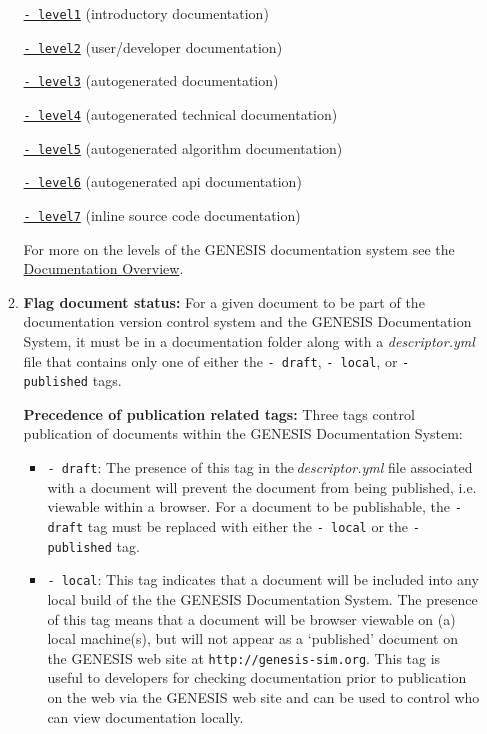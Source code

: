 \documentclass[12pt]{article}
\begin{document}
\begin{enumerate}
\begin{enumerate}
\href{../contents-level1/contents-level1.tex}{{\tt - level1}} (introductory documentation)

\href{../contents-level2/contents-level2.tex}{{\tt - level2}} (user/developer documentation)

\href{../contents-level3/contents-level3.tex}{{\tt - level3}} (autogenerated documentation)

\href{../contents-level4/contents-level4.tex}{{\tt - level4}} (autogenerated technical documentation)

\href{../contents-level5/contents-level5.tex}{{\tt - level5}} (autogenerated algorithm documentation)

\href{../contents-level6/contents-level6.tex}{{\tt - level6}} (autogenerated api documentation)

\href{../contents-level7/contents-level7.tex}{{\tt - level7}} (inline source code documentation)

For more on the levels of the GENESIS documentation system see the \href{../documentation-overview/documentation-overview.tex}{Documentation Overview}.

\item {\bf Flag document status:} For a given document to be part of the documentation version control system and the GENESIS Documentation System, it must be in a documentation folder along with a {\it descriptor.yml} file that contains only one of either the {\tt -\,draft}, {\tt -\,local}, or {\tt -\,published} tags.

{\bf Precedence of publication related tags:} Three tags control publication of documents within the GENESIS Documentation System:
\begin{itemize}
	\item[]{\tt -\,draft}: The presence of this tag in the\,{\it descriptor.yml} file associated with a document will prevent the document 
	from being published,  i.e. viewable within a browser. For a document to be publishable, the {\tt -\,draft} tag must be replaced 
	with either the {\tt -\,local} or the {\tt -\,published} tag.
	
	\item[]{\tt -\,local}: This tag indicates that a document will be included into any local build of the the GENESIS Documentation 
	System. The presence of this tag means that a document will be browser viewable on (a) local machine(s), but will not appear as a `published' 
	document on the GENESIS web site at {\tt http://genesis-sim.org}. This tag is useful to developers for checking documentation prior to publication on the web via the GENESIS web site and can be used to control who can view documentation locally.
	

\end{itemize}
\end{enumerate}
\end{enumerate}
\end{document}
